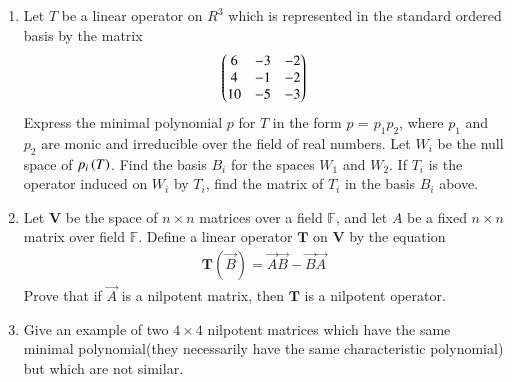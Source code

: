 \renewcommand{\theequation}{\theenumi}
\renewcommand{\thefigure}{\theenumi}
\begin{enumerate}[label=\thesubsection.\arabic*.,ref=\thesubsection.\theenumi]

\item %
Let $T$ be a linear operator on $R^3$ which is represented in the standard ordered basis by the matrix 
\begin{align}
    \begin{pmatrix}6&-3&-2\\
           4&-1&-2\\
           10&-5&-3\end{pmatrix}
\end{align}
Express the minimal polynomial $p$ for $T$ in the form $p$ = $p_1p_2$, where $p_1$ and $p_2$ are monic and irreducible over the field of real numbers. Let $W_i$ be the null space of $p_i\left(T\right)$. Find the basis $B_i$ for the spaces $W_1$ and $W_2$. If $T_i$ is the operator induced on $W_i$ by $T_i$, find the matrix of $T_i$ in the basis $B_i$ above.
%
%
\solution

\item 	Let $\mathbf{V}$ be the space of $ n \times n$  matrices over a field $\mathbb{F}$, and let $A$ be a fixed $n \times n $ matrix over field $\mathbb{F}$. Define a linear operator $\mathbf{T}$ on $\mathbf{V}$  by the equation 
	\begin{align}
	\mathbf{T}(\vec{B}) = \vec{A}\vec{B} - \vec{B}\vec{A}
	\end{align}
	Prove that if $\vec{A}$  is a nilpotent matrix, then $\mathbf{T}$ is a nilpotent operator.
%
\solution

\item Give an example of two $4\times 4$ nilpotent matrices which have the same minimal polynomial(they necessarily have the same characteristic polynomial) but which are not similar. 
%
\solution

\end{enumerate}
